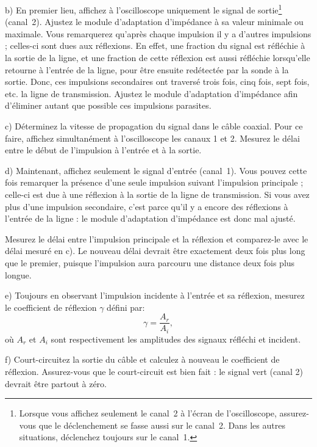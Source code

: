 \documentclass[canadien,12pt,oneside,letterpaper]{article}
\begin{document}
b) En premier lieu, affichez à l'oscilloscope uniquement le signal de sortie\footnote{Lorsque vous affichez seulement le canal~2 à l'écran de l'oscilloscope, assurez-vous que le déclenchement se fasse aussi sur le canal~2. Dans les autres situations, déclenchez toujours sur le canal~1.} (canal~2). Ajustez le module d'adaptation d'impédance à sa valeur minimale ou maximale. Vous remarquerez qu'après chaque impulsion il y a d'autres impulsions ; celles-ci sont dues aux réflexions. En effet, une fraction du signal est réfléchie à la sortie de la ligne, et une fraction de cette réflexion est aussi réfléchie lorsqu'elle retourne à l'entrée de la ligne, pour être ensuite redétectée par la sonde à la sortie. Donc, ces impulsions secondaires ont traversé trois fois, cinq fois, sept fois, etc. la ligne de transmission. Ajustez le module d'adaptation d'impédance afin d'éliminer autant que possible ces impulsions parasites.

c) Déterminez la vitesse de propagation du signal dans le câble coaxial. Pour ce faire, affichez simultanément à l'oscilloscope les canaux 1 et 2. Mesurez le délai entre le début de l'impulsion à l'entrée et à la sortie.

d) Maintenant, affichez seulement le signal d'entrée (canal~1). Vous pouvez cette fois remarquer la présence d'une seule impulsion suivant l'impulsion principale ; celle-ci est due à une réflexion à la sortie de la ligne de transmission. Si vous avez plus d'une impulsion secondaire, c'est parce qu'il y a encore des réflexions à l'entrée de la ligne : le module d'adaptation d'impédance est donc mal ajusté.

Mesurez le délai entre l'impulsion principale et la réflexion et comparez-le avec le délai mesuré en c). Le nouveau délai devrait être exactement deux fois plus long que le premier, puisque l'impulsion aura parcouru une distance deux fois plus longue.

e) Toujours en observant l'impulsion incidente à l'entrée et sa réflexion, mesurez le coefficient de réflexion $\gamma$ défini par:
\begin{equation*}
    \gamma=\frac{A_r}{A_i},
\end{equation*}
où $A_r$ et $A_i$ sont respectivement les amplitudes des signaux réfléchi et incident.

f) Court-circuitez la sortie du câble et calculez à nouveau le coefficient de réflexion. Assurez-vous que le court-circuit est bien fait : le signal vert (canal 2) devrait être partout à zéro.
\end{document}
